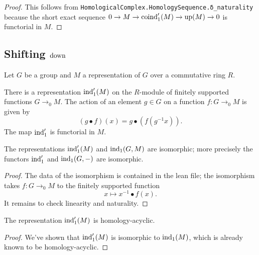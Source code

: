 \begin{proof}
	This follows from \texttt{HomologicalComplex.HomologySequence.δ_naturality}
	because the short exact sequence $0 \to M \to \mathrm{coind}_1'(M) \to \mathrm{up}(M) \to 0$
	is functorial in $M$.
\end{proof}

\subsection{Shifting $\mathrm{down}$}
Let $G$ be a group and $M$ a representation of $G$ over a commutative ring $R$.

\begin{definition}
	\label{def:ind₁'}
	There is a representation $\mathrm{ind}_1' (M)$ on the $R$-module of finitely supported
	functions $G \to_0 M$.
	The action of an element $g \in G$ on a function $f : G \to_0 M$ is given by
	\[
		(g \bullet f)(x) = g \bullet (f (g^{-1}x)).
	\]
	The map $\mathrm{ind}_1'$ is functorial in $M$.
\end{definition}


\begin{lemma}
	\label{lem:ind₁' iso ind₁}
	\leanok
	The representations $\mathrm{ind}_1'(M)$ and $\mathrm{ind}_1(G,M)$ are isomorphic; more precisely the
	functors $\mathrm{ind}_1'$ and $\mathrm{ind}_1(G,-)$ are isomorphic.
\end{lemma}

\begin{proof}
	The data of the isomorphism is contained in the lean file; the isomorphism
	takes $f : G \to_0 M$ to the finitely supported function
	\[
		x \mapsto x^{-1} \bullet f(x).
	\]
	It remains to check linearity and naturality.
\end{proof}

\begin{corollary}
	\label{cor:ind₁' homology-acyclic}
	\leanok
	The representation $\mathrm{ind}_1'(M)$ is homology-acyclic.
\end{corollary}

\begin{proof}
	\leanok
	We've shown that $\mathrm{ind}_1'(M)$ is isomorphic to $\mathrm{ind}_1(M)$, which is already known to
	be homology-acyclic.
\end{proof}


